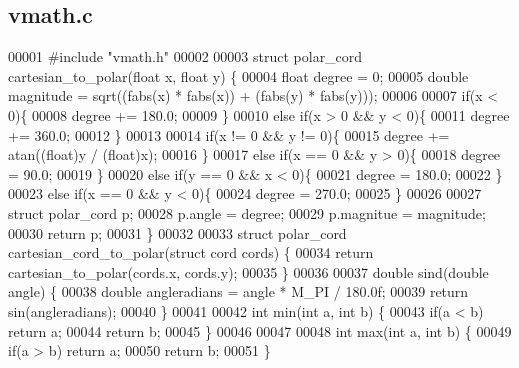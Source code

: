 \subsection{vmath.\+c}
\label{vmath_8c_source}

\begin{DoxyCode}
00001 \textcolor{preprocessor}{#include "vmath.h"}
00002 
00003 \textcolor{keyword}{struct }polar_cord cartesian_to_polar(float x, float y) \{
00004   \textcolor{keywordtype}{float} degree = 0;
00005   \textcolor{keywordtype}{double} magnitude = sqrt((fabs(x) * fabs(x)) + (fabs(y) * fabs(y)));
00006 
00007   \textcolor{keywordflow}{if}(x < 0)\{
00008     degree += 180.0;
00009   \}
00010   \textcolor{keywordflow}{else} \textcolor{keywordflow}{if}(x > 0 && y < 0)\{
00011     degree += 360.0;
00012   \}
00013 
00014   \textcolor{keywordflow}{if}(x != 0 && y != 0)\{
00015     degree += atan((\textcolor{keywordtype}{float})y / (\textcolor{keywordtype}{float})x);
00016   \}
00017   \textcolor{keywordflow}{else} \textcolor{keywordflow}{if}(x == 0 && y > 0)\{
00018     degree = 90.0;
00019   \}
00020   \textcolor{keywordflow}{else} \textcolor{keywordflow}{if}(y == 0 && x < 0)\{
00021     degree = 180.0;
00022   \}
00023   \textcolor{keywordflow}{else} \textcolor{keywordflow}{if}(x == 0 && y < 0)\{
00024     degree = 270.0;
00025   \}
00026 
00027   \textcolor{keyword}{struct }polar_cord p;
00028   p.angle = degree;
00029   p.magnitue = magnitude;
00030   \textcolor{keywordflow}{return} p;
00031 \}
00032 
00033 \textcolor{keyword}{struct }polar_cord cartesian_cord_to_polar(struct cord cords) \{
00034   \textcolor{keywordflow}{return} cartesian_to_polar(cords.x, cords.y);
00035 \}
00036 
00037 \textcolor{keywordtype}{double} sind(\textcolor{keywordtype}{double} angle) \{
00038     \textcolor{keywordtype}{double} angleradians = angle * M_PI / 180.0f;
00039     \textcolor{keywordflow}{return} sin(angleradians);
00040 \}
00041 
00042 \textcolor{keywordtype}{int} min(\textcolor{keywordtype}{int} a, \textcolor{keywordtype}{int} b) \{
00043   \textcolor{keywordflow}{if}(a < b) \textcolor{keywordflow}{return} a;
00044   \textcolor{keywordflow}{return} b;
00045 \}
00046 
00047 
00048 \textcolor{keywordtype}{int} max(\textcolor{keywordtype}{int} a, \textcolor{keywordtype}{int} b) \{
00049   \textcolor{keywordflow}{if}(a > b) \textcolor{keywordflow}{return} a;
00050   \textcolor{keywordflow}{return} b;
00051 \}
\end{DoxyCode}

